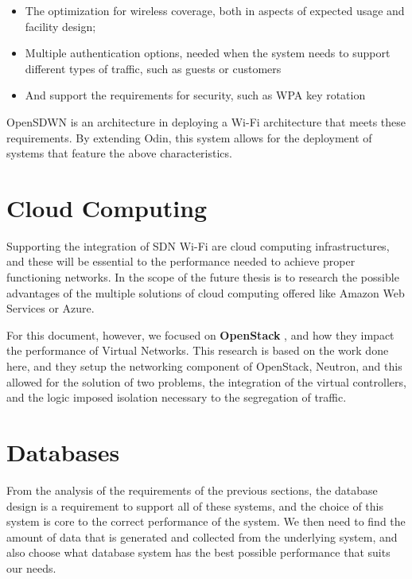 \begin{itemize}
    \item The optimization for wireless coverage, both in aspects of expected usage and facility design;
    \item Multiple authentication options, needed when the system needs to support different types of traffic, such as guests or customers
    \item And support the requirements for security, such as WPA key rotation 
\end{itemize}


OpenSDWN \cite{schulz-zander_opensdwn:_2015} is an architecture in deploying a Wi-Fi architecture that meets these requirements. By extending Odin, this system allows for the deployment of systems that feature the above characteristics.


\section {Cloud Computing}
\hspace {5mm}

Supporting the integration of SDN Wi-Fi are cloud computing infrastructures, and these will be essential to the performance needed to achieve proper functioning networks. In the scope of the future thesis is to research the possible advantages of the multiple solutions of cloud computing offered like Amazon Web Services or Azure.

\par For this document, however, we focused on \textbf{OpenStack} \cite{callegati_performance_2014}, and how they impact the performance of Virtual Networks. This research is based on the work done here, and they setup the networking component of OpenStack, Neutron, and this allowed for the solution of two problems, the integration of the virtual controllers, and the logic imposed isolation necessary to the segregation of traffic. 

\section {Databases}
\hspace {5mm}

From the analysis of the requirements of the previous sections, the database design is a requirement to support all of these systems, and the choice of this system is core to the correct performance of the system. We then need to find the amount of data that is generated and collected from the underlying system, and also choose what database system has the best possible performance that suits our needs.

